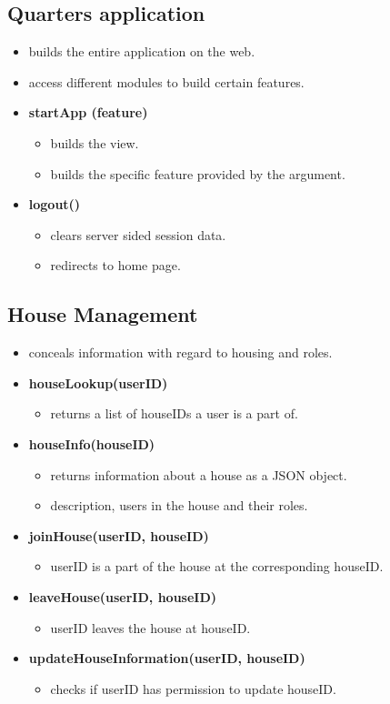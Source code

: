 \documentclass[12pt]{article}
\begin{document}
\subsection{Quarters application}
\begin{itemize}
    \item builds the entire application on the web.
    \item access different modules to build certain features.
    \item \textbf{startApp (feature)}
    \begin{itemize}
        \item builds the view.
        \item builds the specific feature provided by the argument.
    \end{itemize}
        \item \textbf{logout()}
    \begin{itemize}
        \item clears server sided session data.
        \item redirects to home page.
    \end{itemize}
\end{itemize}

\subsection{House Management}
\begin{itemize}
    \item conceals information with regard to housing and roles.
    \item \textbf{houseLookup(userID)}
    \begin{itemize}
        \item returns a list of houseIDs a user is a part of.
    \end{itemize}
    \item \textbf{houseInfo(houseID)}
    \begin{itemize}
        \item returns information about a house as a JSON object.
        \item description, users in the house and their roles.
    \end{itemize}
    \item \textbf{joinHouse(userID, houseID)}
    \begin{itemize}
        \item userID is a part of the house at the corresponding houseID.
    \end{itemize}
    \item \textbf{leaveHouse(userID, houseID)}
    \begin{itemize}
        \item userID leaves the house at houseID.
    \end{itemize}
    \item \textbf{updateHouseInformation(userID, houseID)}
    \begin{itemize}
        \item checks if userID has permission to update houseID.
    \end{itemize}
\end{itemize}
\end{document}
